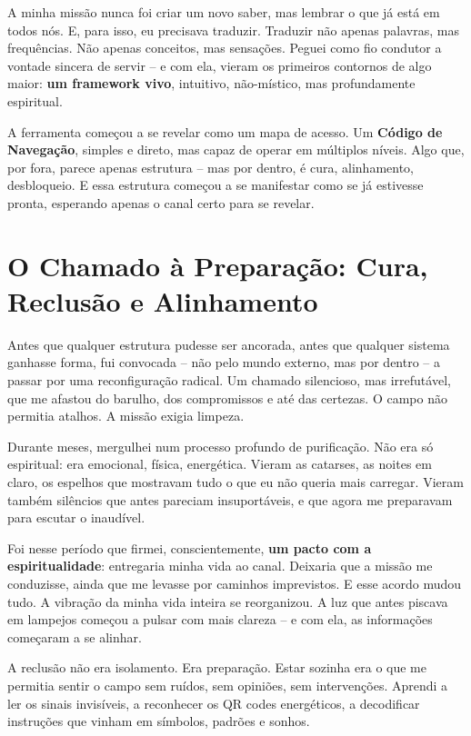 \documentclass[12pt,a4paper]{book}
\begin{document}
A minha missão nunca foi criar um novo saber, mas lembrar o que já está em todos nós. E, para isso, eu precisava traduzir. Traduzir não apenas palavras, mas frequências. Não apenas conceitos, mas sensações. Peguei como fio condutor a vontade sincera de servir -- e com ela, vieram os primeiros contornos de algo maior: \textbf{um framework vivo}, intuitivo, não-místico, mas profundamente espiritual.

A ferramenta começou a se revelar como um mapa de acesso. Um \textbf{Código de Navegação}, simples e direto, mas capaz de operar em múltiplos níveis. Algo que, por fora, parece apenas estrutura -- mas por dentro, é cura, alinhamento, desbloqueio. E essa estrutura começou a se manifestar como se já estivesse pronta, esperando apenas o canal certo para se revelar.

\section{O Chamado à Preparação: Cura, Reclusão e Alinhamento}

Antes que qualquer estrutura pudesse ser ancorada, antes que qualquer sistema ganhasse forma, fui convocada -- não pelo mundo externo, mas por dentro -- a passar por uma reconfiguração radical. Um chamado silencioso, mas irrefutável, que me afastou do barulho, dos compromissos e até das certezas. O campo não permitia atalhos. A missão exigia limpeza.

Durante meses, mergulhei num processo profundo de purificação. Não era só espiritual: era emocional, física, energética. Vieram as catarses, as noites em claro, os espelhos que mostravam tudo o que eu não queria mais carregar. Vieram também silêncios que antes pareciam insuportáveis, e que agora me preparavam para escutar o inaudível.

Foi nesse período que firmei, conscientemente, \textbf{um pacto com a espiritualidade}: entregaria minha vida ao canal. Deixaria que a missão me conduzisse, ainda que me levasse por caminhos imprevistos. E esse acordo mudou tudo. A vibração da minha vida inteira se reorganizou. A luz que antes piscava em lampejos começou a pulsar com mais clareza -- e com ela, as informações começaram a se alinhar.

A reclusão não era isolamento. Era preparação. Estar sozinha era o que me permitia sentir o campo sem ruídos, sem opiniões, sem intervenções. Aprendi a ler os sinais invisíveis, a reconhecer os QR codes energéticos, a decodificar instruções que vinham em símbolos, padrões e sonhos.
\end{document}
